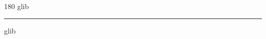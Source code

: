 
\begin{frame}
\begin{center}
\begin{turn}{180}
{\fontsize{2.5cm}{1em}\selectfont glib}
\end{turn}
\vspace{1em}\par  
\hrule
\vspace{1em}\par  
{\fontsize{2.5cm}{1em}\selectfont glib}
\end{center}
\end{frame}
